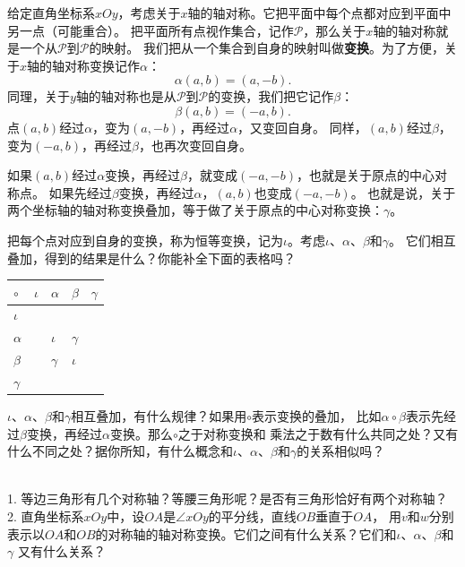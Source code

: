 \documentclass[12pt,UTF8,fontset=none]{ctexbook}
\begin{document}
给定直角坐标系$xOy$，考虑关于$x$轴的轴对称。它把平面中每个点都对应到平面中另一点（可能重合）。
把平面所有点视作集合，记作$\mathcal{P}$，那么关于$x$轴的轴对称就是一个从$\mathcal{P}$到$\mathcal{P}$的映射。
我们把从一个集合到自身的映射叫做\textbf{变换}。为了方便，关于$x$轴的轴对称变换记作$\alpha$：
$$ \alpha (a, b) = (a, -b).$$
同理，关于$y$轴的轴对称也是从$\mathcal{P}$到$\mathcal{P}$的变换，我们把它记作$\beta$：
$$ \beta (a, b) = (-a, b).$$
点$(a, b)$经过$\alpha$，变为$(a, -b)$，再经过$\alpha$，又变回自身。
同样，$(a, b)$经过$\beta$，变为$(-a, b)$，再经过$\beta$，也再次变回自身。

如果$(a, b)$经过$\alpha$变换，再经过$\beta$，就变成$(-a, -b)$，也就是关于原点的中心对称点。
如果先经过$\beta$变换，再经过$\alpha$，$(a, b)$也变成$(-a, -b)$。
也就是说，关于两个坐标轴的轴对称变换叠加，等于做了关于原点的中心对称变换：$\gamma$。

把每个点对应到自身的变换，称为恒等变换，记为$\iota$。考虑$\iota$、$\alpha$、$\beta$和$\gamma$。
它们相互叠加，得到的结果是什么？你能补全下面的表格吗？
\begin{center}
    \begin{tabular}{  | p{2em}<{\centering} | p{2em}<{\centering} | p{2em}<{\centering} | p{2em}<{\centering} | p{2em}<{\centering} | }
        \hline
        $\circ$ & $\iota$ & $\alpha$ & $\beta$ & $\gamma$ \\ [0.5ex] 
        \hline
        $\iota$ &  &  &  &  \\  
        \hline
        $\alpha$ &  & $\iota$ & $\gamma$ &  \\  
        \hline
        $\beta$ &  & $\gamma$ & $\iota$ &  \\  
        \hline
        $\gamma$ &  &  &  &  \\ 
        \hline 
    \end{tabular}
\end{center}
$\iota$、$\alpha$、$\beta$和$\gamma$相互叠加，有什么规律？如果用$\circ$表示变换的叠加，
比如$\alpha \circ \beta$表示先经过$\beta$变换，再经过$\alpha$变换。那么$\circ$之于对称变换和
乘法之于数有什么共同之处？又有什么不同之处？据你所知，有什么概念和$\iota$、$\alpha$、$\beta$和$\gamma$的关系相似吗？

\begin{sk}\label{xt:4-2-0}
    \mbox{}\\
    1. 等边三角形有几个对称轴？等腰三角形呢？是否有三角形恰好有两个对称轴？\\
    2. 直角坐标系$xOy$中，设$OA$是$\angle xOy$的平分线，直线$OB$垂直于$OA$，
    用$v$和$w$分别表示以$OA$和$OB$的对称轴的轴对称变换。它们之间有什么关系？它们和$\iota$、$\alpha$、$\beta$和$\gamma$
    又有什么关系？
\end{sk}
\end{document}
